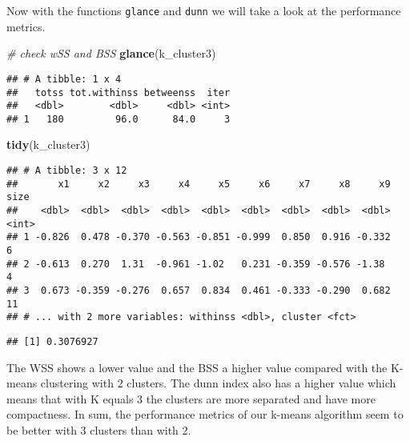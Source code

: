 \documentclass[]{article}
\newenvironment{Shaded}{\begin{snugshade}}{\end{snugshade}}
\newcommand{\KeywordTok}[1]{\textcolor[rgb]{0.13,0.29,0.53}{\textbf{#1}}}
\newcommand{\DataTypeTok}[1]{\textcolor[rgb]{0.13,0.29,0.53}{#1}}
\newcommand{\StringTok}[1]{\textcolor[rgb]{0.31,0.60,0.02}{#1}}
\newcommand{\CommentTok}[1]{\textcolor[rgb]{0.56,0.35,0.01}{\textit{#1}}}
\newcommand{\OperatorTok}[1]{\textcolor[rgb]{0.81,0.36,0.00}{\textbf{#1}}}
\newcommand{\NormalTok}[1]{#1}
\begin{document}
Now with the functions \texttt{glance} and \texttt{dunn} we will take a
look at the performance metrics.

\begin{Shaded}
\begin{Highlighting}[]
\CommentTok{# check wSS and BSS}
\KeywordTok{glance}\NormalTok{(k_cluster3)}
\end{Highlighting}
\end{Shaded}

\begin{verbatim}
## # A tibble: 1 x 4
##   totss tot.withinss betweenss  iter
##   <dbl>        <dbl>     <dbl> <int>
## 1   180         96.0      84.0     3
\end{verbatim}

\begin{Shaded}
\begin{Highlighting}[]
\KeywordTok{tidy}\NormalTok{(k_cluster3)}
\end{Highlighting}
\end{Shaded}

\begin{verbatim}
## # A tibble: 3 x 12
##       x1     x2     x3     x4     x5     x6     x7     x8     x9  size
##    <dbl>  <dbl>  <dbl>  <dbl>  <dbl>  <dbl>  <dbl>  <dbl>  <dbl> <int>
## 1 -0.826  0.478 -0.370 -0.563 -0.851 -0.999  0.850  0.916 -0.332     6
## 2 -0.613  0.270  1.31  -0.961 -1.02   0.231 -0.359 -0.576 -1.38      4
## 3  0.673 -0.359 -0.276  0.657  0.834  0.461 -0.333 -0.290  0.682    11
## # ... with 2 more variables: withinss <dbl>, cluster <fct>
\end{verbatim}

\begin{Shaded}
\end{Shaded}

\begin{verbatim}
## [1] 0.3076927
\end{verbatim}

The WSS shows a lower value and the BSS a higher value compared with the
K-means clustering with 2 clusters. The dunn index also has a higher
value which means that with K equals 3 the clusters are more separated
and have more compactness. In sum, the performance metrics of our
k-means algorithm seem to be better with 3 clusters than with 2.
\end{document}
